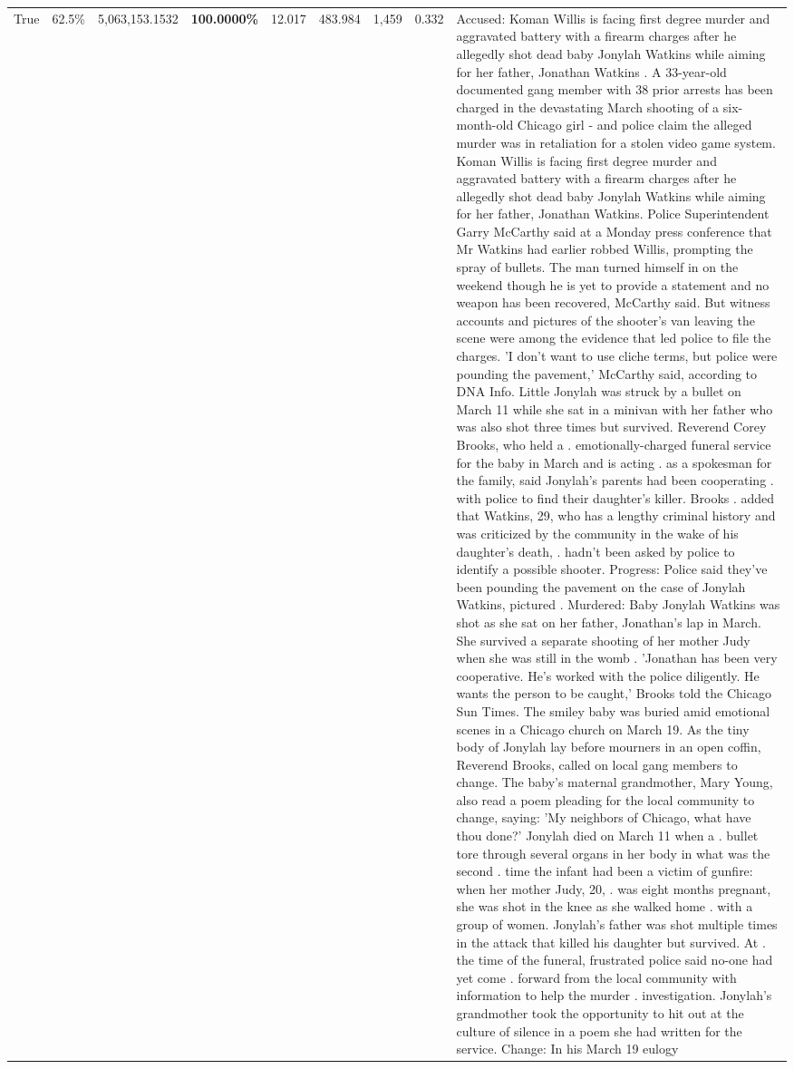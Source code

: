 \begin{table}[H]
\begin{tabular}{lllrlllll}
True & 62.5\% & 5,063,153.1532 & \bfseries \color{red} 100.0000\% & 12.017 & 483.984 & 1,459 & 0.332 & Accused: Koman Willis is facing first degree murder and aggravated battery with a firearm charges after he allegedly shot dead baby Jonylah Watkins while aiming for her father, Jonathan Watkins . A 33-year-old documented gang member with 38 prior arrests has been charged in the devastating March shooting of a six-month-old Chicago girl - and police claim the alleged murder was in retaliation for a stolen video game system. Koman Willis is facing first degree murder and aggravated battery with a firearm charges after he allegedly shot dead baby Jonylah Watkins while aiming for her father, Jonathan Watkins. Police Superintendent Garry McCarthy said at a Monday press conference that Mr Watkins had earlier robbed Willis, prompting the spray of bullets. The man turned himself in on the weekend though he is yet to provide a statement and no weapon has been recovered, McCarthy said. But witness accounts and pictures of the shooter's van leaving the scene were among the evidence that led police to file the charges. 'I don't want to use cliche terms, but police were pounding the pavement,' McCarthy said, according to DNA Info. Little Jonylah was struck by a bullet on March 11 while she sat in a minivan with her father who was also shot three times but survived. Reverend Corey Brooks, who held a . emotionally-charged funeral service for the baby in March and is acting . as a spokesman for the family, said Jonylah's parents had been cooperating . with police to find their daughter's killer. Brooks . added that Watkins, 29, who has a lengthy criminal history and was criticized by the community in the wake of his daughter's death, . hadn't been asked by police to identify a possible shooter. Progress: Police said they've been pounding the pavement on the case of Jonylah Watkins, pictured . Murdered: Baby Jonylah Watkins was shot as she sat on her father, Jonathan's lap in March. She survived a separate shooting of her mother Judy when she was still in the womb . 'Jonathan has been very cooperative. He's worked with the police diligently. He wants the person to be caught,' Brooks told the Chicago Sun Times. The smiley baby was buried amid emotional scenes in a Chicago church on March 19. As the tiny body of Jonylah lay before mourners in an open coffin, Reverend Brooks, called on local gang members to change. The baby's maternal grandmother, Mary Young, also read a poem pleading for the local community to change, saying: 'My neighbors of Chicago, what have thou done?' Jonylah died on March 11 when a . bullet tore through several organs in her body in what was the second . time the infant had been a victim of gunfire: when her mother Judy, 20, . was eight months pregnant, she was shot in the knee as she walked home . with a group of women. Jonylah's father was shot multiple times in the attack that killed his daughter but survived. At . the time of the funeral, frustrated police said no-one had yet come . forward from the local community with information to help the murder . investigation. Jonylah's grandmother took the opportunity to hit out at the culture of silence in a poem she had written for the service. Change: In his March 19 eulogy 
\end{tabular}
\end{table}
